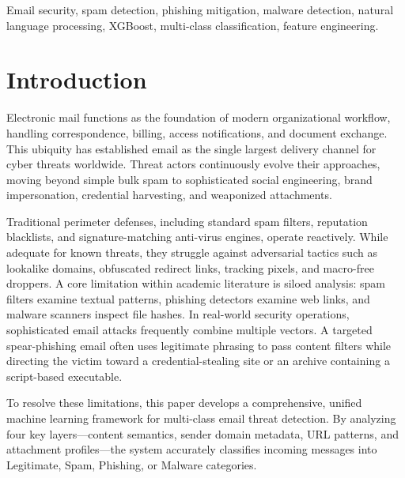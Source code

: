 \documentclass[conference]{IEEEtran}
\begin{document}
\begin{IEEEkeywords}
Email security, spam detection, phishing mitigation, malware detection, natural language processing, XGBoost, multi-class classification, feature engineering.
\end{IEEEkeywords}

\section{Introduction}
Electronic mail functions as the foundation of modern organizational workflow, handling correspondence, billing, access notifications, and document exchange. This ubiquity has established email as the single largest delivery channel for cyber threats worldwide. Threat actors continuously evolve their approaches, moving beyond simple bulk spam to sophisticated social engineering, brand impersonation, credential harvesting, and weaponized attachments.

Traditional perimeter defenses, including standard spam filters, reputation blacklists, and signature-matching anti-virus engines, operate reactively. While adequate for known threats, they struggle against adversarial tactics such as lookalike domains, obfuscated redirect links, tracking pixels, and macro-free droppers. A core limitation within academic literature is siloed analysis: spam filters examine textual patterns, phishing detectors examine web links, and malware scanners inspect file hashes. In real-world security operations, sophisticated email attacks frequently combine multiple vectors. A targeted spear-phishing email often uses legitimate phrasing to pass content filters while directing the victim toward a credential-stealing site or an archive containing a script-based executable.

To resolve these limitations, this paper develops a comprehensive, unified machine learning framework for multi-class email threat detection. By analyzing four key layers---content semantics, sender domain metadata, URL patterns, and attachment profiles---the system accurately classifies incoming messages into Legitimate, Spam, Phishing, or Malware categories.
\end{document}
